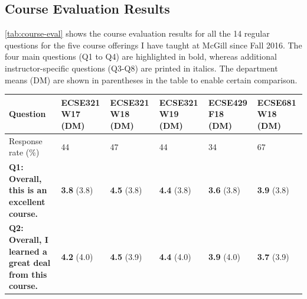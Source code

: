 \subsection{Course Evaluation Results}

\autoref{tab:course-eval} shows the course evaluation results for all the 14 regular questions for the five course offerings I have taught at McGill since Fall 2016. The four main questions (Q1 to Q4) are highlighted in bold, whereas additional instructor-specific questions (Q3-Q8) are printed in italics. The department means (DM) are shown in parentheses in the table to enable certain comparison. 

\begin{table}[htb]
\footnotesize
\begin{tabular}{@{}p{9cm}p{1.1cm}p{1.1cm}p{1.1cm}p{1.1cm}p{1.1cm}@{}}
\toprule
\textbf{Question} & \textbf{ECSE321} \newline \textbf{W17} \newline \textbf{(DM)} & 
\textbf{ECSE321} \newline \textbf{W18} \newline \textbf{(DM)} & 
\textbf{ECSE321} \newline \textbf{W19} \newline \textbf{(DM)} & 
\textbf{ECSE429} \newline \textbf{F18} \newline \textbf{(DM)} & 
\textbf{ECSE681} \newline \textbf{W18} \newline \textbf{(DM)} \\ \toprule
Response rate (\%) & 44 & 47 & 44 & 34 & 67 \\ \midrule
\textbf{Q1: Overall, this is an excellent course.} & \textbf{3.8} \newline (3.8) & \textbf{4.5} \newline (3.8) & \textbf{4.4} \newline (3.8) & \textbf{3.6} \newline (3.8) & \textbf{3.9} \newline (3.8)  \\ \midrule

\textbf{Q2: Overall, I learned a great deal from this course.} & \textbf{4.2} \newline (4.0) & \textbf{4.5} \newline (3.9) & \textbf{4.4} \newline (4.0) & \textbf{3.9} \newline (4.0) & \textbf{3.7} \newline (3.9)  \\ \midrule


\end{tabular}
\end{table}
